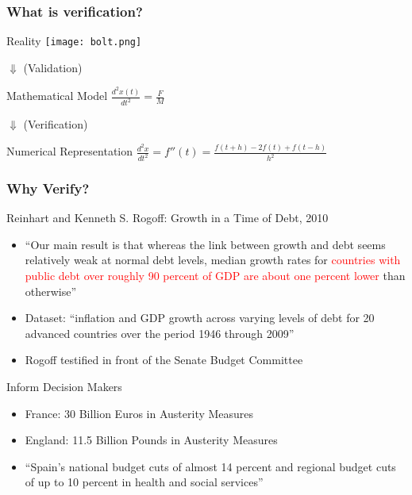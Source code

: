 \documentclass[mathserif]{beamer}
\begin{document}
\begin{frame}
 \frametitle{What is verification?}

 \begin{center}
  \center
      \begin{block}{Reality}
       \center
       \texttt{[image: bolt.png]}\\
       \end{block}
  $\Downarrow$ (Validation)
      \begin{block}{Mathematical Model}
       \center
       $\frac{d^2x(t)}{dt^2} = \frac{F}{M}$\\
      \end{block}
  $\Downarrow$ (Verification)
  \begin{block}{Numerical Representation}
   \center
   $\frac{d^2x}{dt^2} = f''(t) = \frac{f(t+h) - 2 f(t) + f(t-h)}{h^2}$
   \end{block}
 \end{center}
\end{frame}

\begin{frame}
  \frametitle{Why Verify?}
  \begin{block}{Reinhart and Kenneth S. Rogoff: Growth in a Time of Debt, 2010}
    \begin{itemize}
    \item ``Our main result is that whereas the link between growth and
	  debt seems relatively weak at normal debt levels, median
	  growth rates for  \textcolor{red}{countries with public debt
	  over roughly 90 percent of GDP are about one percent lower}
	  than otherwise'' 
     \item Dataset: ``inflation and GDP growth across varying levels
	   of debt for 20 advanced countries over the period 1946
	   through 2009''
     \item Rogoff testified in front of the Senate Budget Committee 
   \end{itemize}
  \end{block}
  \begin{block}{Inform Decision Makers}
    \begin{itemize}
     \item France: 30 Billion Euros in Austerity Measures
     \item England: 11.5 Billion Pounds in Austerity Measures
     \item ``Spain's national budget cuts of almost 14 percent
	   and regional budget cuts of up to 10 percent in health and
	   social services''
    \end{itemize}
  \end{block}
 
\end{frame}
\end{document}

